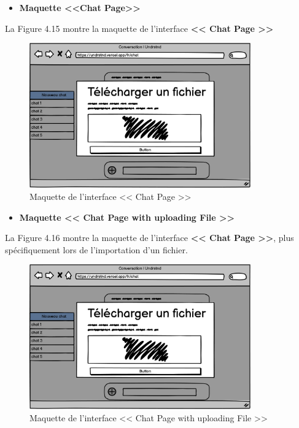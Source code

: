 \begin{itemize}
    \item \textbf{Maquette <<Chat Page>>}
\end{itemize}
La Figure 4.15 montre la maquette de l’interface \textbf{<< Chat Page >>}
\begin{figure}[H]
    \centering
    \includegraphics[width=0.85\textwidth,height=0.4\textwidth]{images/chp4/fig16.png}
    \caption{Maquette de l’interface << Chat Page >>}
    \label{fig:Maquette de l’interface <<Chat Page>>}    
\end{figure}
\begin{itemize}
    \item \textbf{Maquette << Chat Page with uploading File >>}
\end{itemize}
La Figure 4.16 montre la maquette de l’interface \textbf{ << Chat Page >>}, plus spécifiquement lors de l’importation d’un fichier.
\begin{figure}[H]
    \centering
    \includegraphics[width=0.85\textwidth,height=0.5\textwidth]{images/chp4/fig16.png}
    \caption{Maquette de l’interface << Chat Page with uploading File >>}
    \label{fig:Maquette de l’interface <<Chat Page with uploading File>>}    
\end{figure}
